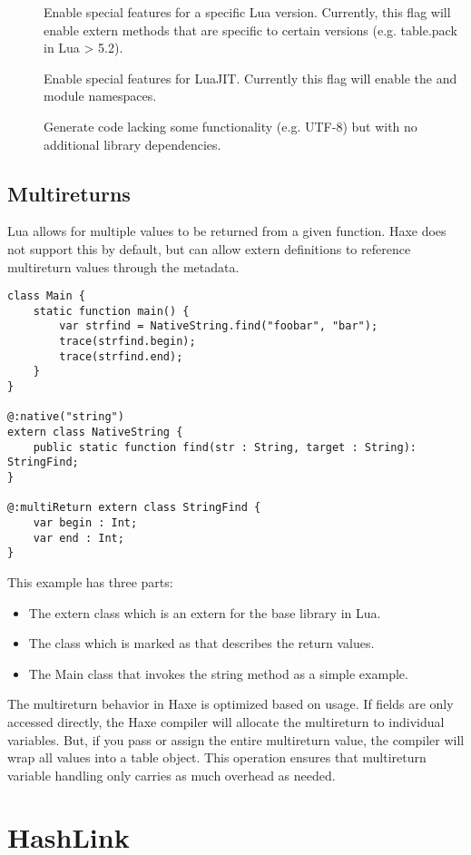 \begin{description}
	\item[] Enable special features for a specific Lua version. Currently, this flag will enable extern methods that are specific to certain versions (e.g. table.pack in Lua > 5.2).
	\item[] Enable special features for LuaJIT.  Currently this flag will enable the  and  module namespaces.
	\item[] Generate code lacking some functionality (e.g. UTF-8) but with no additional library dependencies.
\end{description}

\subsection{Multireturns}
\label{target-lua-multireturns}

Lua allows for multiple values to be returned from a given function.  Haxe
does not support this by default, but can allow extern definitions to reference
multireturn values through the  metadata.

\begin{lstlisting}
class Main {
    static function main() {
        var strfind = NativeString.find("foobar", "bar");
        trace(strfind.begin);
        trace(strfind.end);
    }
}

@:native("string")
extern class NativeString {
	public static function find(str : String, target : String): StringFind;
}

@:multiReturn extern class StringFind {
	var begin : Int;
	var end : Int;
}
\end{lstlisting}

This example has three parts:

\begin{itemize}
	\item The extern class  which is an extern for the base  library in Lua.
	\item The  class which is marked as  that describes the return values.
	\item The Main class that invokes the string method as a simple example.
\end{itemize}

The multireturn behavior in Haxe is optimized based on usage.  If fields are
only accessed directly, the Haxe compiler will allocate the multireturn to
individual variables.  But, if you pass or assign the entire multireturn value,
the compiler will wrap all values into a table object.  This operation ensures
that multireturn variable handling only carries as much overhead as needed.



\section{HashLink}
\label{target-hl}
